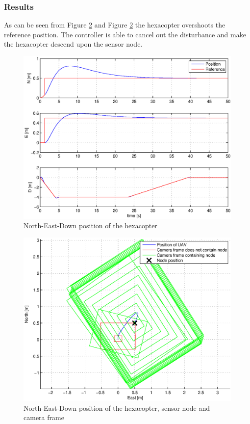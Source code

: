 \subsubsection{Results}
As can be seen from Figure \ref{posFrameDisturbance} and Figure \ref{posFrameDisturbance} the hexacopter overshoots the reference position. The controller is able to cancel out the disturbance and make the hexacopter descend upon the sensor node.
\begin{figure}[H]
\centering
\includegraphics[width = 12cm]{fig/plots/simulation/positionDisturbance.eps}
\caption{North-East-Down position of the hexacopter}
\label{posDisturbance}
\end{figure}
\begin{figure}[H]
\centering
\includegraphics[width = 12cm]{fig/plots/simulation/positionFrameDisturbance.eps}
\caption{North-East-Down position of the hexacopter, sensor node and camera frame}
\label{posFrameDisturbance}
\end{figure}
